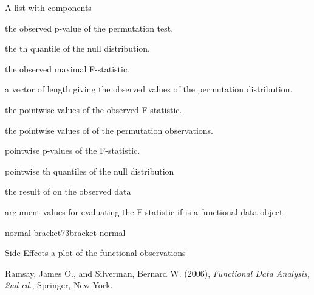 \documentclass{article}
\begin{document}
\begin{Value}
A list with components
\begin{ldescription}
\item[\code{pval}] the observed p-value of the permutation test.
\item[\code{qval}] the th quantile of the null distribution.
\item[\code{Fobs}] the observed maximal F-statistic.
\item[\code{Fnull}] a vector of length  giving the observed values of the
permutation distribution.

\item[\code{Fvals}] the pointwise values of the observed F-statistic.
\item[\code{Fnullvals}] the pointwise values of of the permutation observations.

\item[\code{pvals.pts}] pointwise p-values of the F-statistic.
\item[\code{qvals.pts}] pointwise th quantiles of the null distribution

\item[\code{fRegressList}] the result of  on the observed data

\item[\code{argvals}] argument values for evaluating the F-statistic if  is
a functional data object.

\end{ldescription}

normal-bracket73bracket-normal
\end{Value}
\begin{Section}{Side Effects}
a plot of the functional observations
\end{Section}
\begin{Source}\relax
Ramsay, James O., and Silverman, Bernard W. (2006), \emph{Functional
Data Analysis, 2nd ed.}, Springer, New York.
\end{Source}
\begin{SeeAlso}\relax
{}
\end{SeeAlso}
\end{document}
